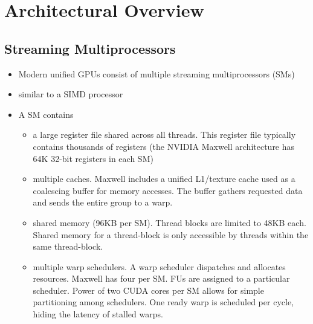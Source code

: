 \documentclass[prodmode,acmtecs]{acmsmall} %
\begin{document}
\section{Architectural Overview} \label{sec:architecture}
\subsection{Streaming Multiprocessors}
\begin{itemize}
  \item Modern unified GPUs consist of multiple streaming multiprocessors (SMs)
  \item similar to a SIMD processor
  \item A SM contains
  \begin{itemize}
    \item a large register file shared across all threads. This register file
    typically contains thousands of registers (the NVIDIA Maxwell architecture
    has 64K 32-bit registers in each SM)
    \item multiple caches. Maxwell includes a unified L1/texture cache used as a
    coalescing buffer for memory accesses. The buffer gathers requested data and
    sends the entire group to a warp.
    \item shared memory (96KB per SM). Thread blocks are limited to 48KB each.
    Shared memory for a thread-block is only accessible by threads within the
    same thread-block.
    \item multiple warp schedulers. A warp scheduler dispatches and allocates
    resources. Maxwell has four per SM. FUs are assigned to a particular
    scheduler. Power of two CUDA cores per SM allows for simple partitioning
    among schedulers. One ready warp is scheduled per cycle, hiding the latency
    of stalled warps.
  \end{itemize}

\end{itemize}
\end{document}
